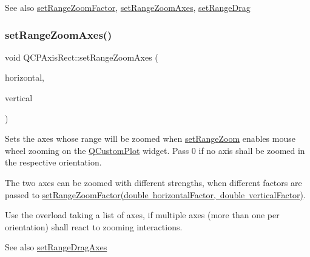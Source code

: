 \begin{DoxySeeAlso}{See also}
\mbox{\hyperlink{class_q_c_p_axis_rect_a895d7ac745ea614e04056244b3c138ac}{set\+Range\+Zoom\+Factor}}, \mbox{\hyperlink{class_q_c_p_axis_rect_a9442cca2aa358405f39a64d51eca13d2}{set\+Range\+Zoom\+Axes}}, \mbox{\hyperlink{class_q_c_p_axis_rect_ae6aef2f7211ba6097c925dcd26008418}{set\+Range\+Drag}} 
\end{DoxySeeAlso}
\mbox{\label{class_q_c_p_axis_rect_a9442cca2aa358405f39a64d51eca13d2}} 
\subsubsection{\texorpdfstring{setRangeZoomAxes()}{setRangeZoomAxes()}\hspace{0.1cm}{\footnotesize\ttfamily [1/3]}}
{\footnotesize\ttfamily void Q\+C\+P\+Axis\+Rect\+::set\+Range\+Zoom\+Axes (\begin{DoxyParamCaption}\item[{\mbox{\hyperlink{class_q_c_p_axis}{Q\+C\+P\+Axis}} $\ast$}]{horizontal,  }\item[{\mbox{\hyperlink{class_q_c_p_axis}{Q\+C\+P\+Axis}} $\ast$}]{vertical }\end{DoxyParamCaption})}

Sets the axes whose range will be zoomed when \mbox{\hyperlink{class_q_c_p_axis_rect_a7960a9d222f1c31d558b064b60f86a31}{set\+Range\+Zoom}} enables mouse wheel zooming on the \mbox{\hyperlink{class_q_custom_plot}{Q\+Custom\+Plot}} widget. Pass 0 if no axis shall be zoomed in the respective orientation.

The two axes can be zoomed with different strengths, when different factors are passed to \mbox{\hyperlink{class_q_c_p_axis_rect_a895d7ac745ea614e04056244b3c138ac}{set\+Range\+Zoom\+Factor(double horizontal\+Factor, double vertical\+Factor)}}.

Use the overload taking a list of axes, if multiple axes (more than one per orientation) shall react to zooming interactions.

\begin{DoxySeeAlso}{See also}
\mbox{\hyperlink{class_q_c_p_axis_rect_a648cce336bd99daac4a5ca3e5743775d}{set\+Range\+Drag\+Axes}} 
\end{DoxySeeAlso}
\mbox{\label{class_q_c_p_axis_rect_a89c1ab7ee6d2a14b56c57c9a796ba623}} 
